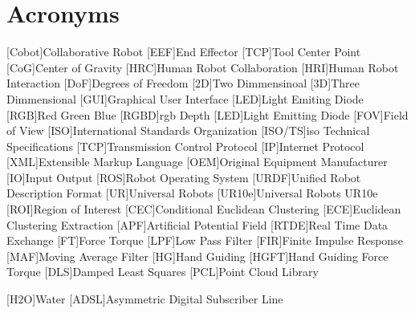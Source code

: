 \chapter{Acronyms}

\footnotesize
\SingleSpacing

\begin{multicols}{2}
\begin{acronym}[AAAAAA]

    [Cobot]{Collaborative Robot}
    [EEF]{End Effector}
    [TCP]{Tool Center Point}
    [CoG]{Center of Gravity}
    [HRC]{Human Robot Collaboration}
    [HRI]{Human Robot Interaction}
    [DoF]{Degrees of Freedom}
    [2D]{Two Dimmensinoal}
    [3D]{Three Dimmensional}
    [GUI]{Graphical User Interface}
    [LED]{Light Emiting Diode}
    [RGB]{Red Green Blue}
    [RGBD]{\acs{rgb} Depth}
    [LED]{Light Emitting Diode}
    [FOV]{Field of View}
    [ISO]{International Standards Organization}
    [ISO/TS]{\acs{iso} Technical Specifications}
    [TCP]{Transmission Control Protocol}
    [IP]{Internet Protocol}
    [XML]{Extensible Markup Language}
    [OEM]{Original Equipment Manufacturer}
    [IO]{Input Output}
    [ROS]{Robot Operating System}
    [URDF]{Unified Robot Description Format}
    [UR]{Universal Robots}
    [UR10e]{Universal Robots UR10e}
    [ROI]{Region of Interest}
    [CEC]{Conditional Euclidean Clustering}
    [ECE]{Euclidean Clustering Extraction}
    [APF]{Artificial Potential Field}
    [RTDE]{Real Time Data Exchange}
    [FT]{Force Torque}
    [LPF]{Low Pass Filter}
    [FIR]{Finite Impulse Response}
    [MAF]{Moving Average Filter}
    [HG]{Hand Guiding}
    [HGFT]{Hand Guiding Force Torque}
    [DLS]{Damped Least Squares}
    [PCL]{Point Cloud Library}

	[H2O]{Water}
	[ADSL]{Asymmetric Digital Subscriber Line}

\end{acronym}
\end{multicols}

